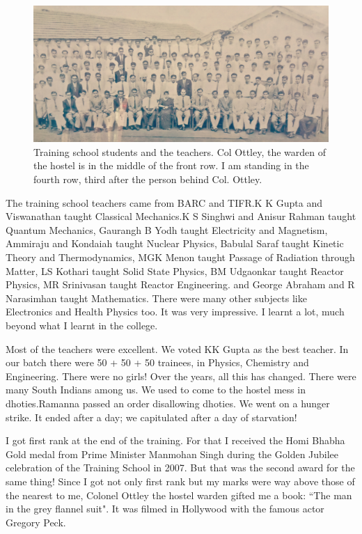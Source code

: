 \begin{figure}[H]
\centering
\includegraphics[width=1\textwidth]{images/new-images/06-Rajaji-TS.jpg}
\caption{Training school students and the teachers. Col Ottley, the warden of the hostel is in the middle of the front row. I am standing in the fourth row, third after the person behind Col. Ottley.}
\end{figure}

The training school teachers came from BARC and TIFR.\break K K Gupta and 
Viswanathan taught Classical Mechanics.\break K S Singhwi and Anisur Rahman 
taught Quantum Mechanics, Gaurangh B Yodh taught Electricity and 
Magnetism, Ammiraju and Kondaiah taught Nuclear Physics, Babulal Saraf 
taught Kine\-tic Theory and Thermodynamics, MGK Menon taught Passage of 
Radiation through Matter, LS Kothari taught Solid State Physics, BM 
Udgaonkar taught Reactor Physics, MR Srinivasan taught Reactor 
Engineering. and George Abraham and R Narasimhan taught Mathematics. 
There were many other subjects like Electro\-nics and Health Physics too. 
It was very impressive. I learnt a lot, much beyond what I learnt in the 
college.

Most of the teachers were excellent. We voted KK Gupta as the best teacher.
In our batch there were 50 + 50 + 50 trainees, in Physics, Chemistry
and Engineering. There were no girls! Over the years, all this has changed.
There were many South Indians among us. We used to come to the hostel 
mess in dhoties.\break Ramanna passed an order disallowing dhoties. We went on 
a hunger strike. It ended after a day; we capitulated after a day of 
starvation!

I got first rank at the end of the training. For that I received the 
Homi Bhabha Gold medal from Prime Minister Manmohan Singh during the 
Golden Jubilee celebration of the Training School in 2007. But that was 
the second award for the same thing! Since I got not only first rank but 
my marks were way above those of the nearest to me, Colonel Ottley the 
hostel warden gifted me a book: ``The man in the grey flannel suit". It 
was filmed in Hollywood with the famous actor Gregory Peck.
 
